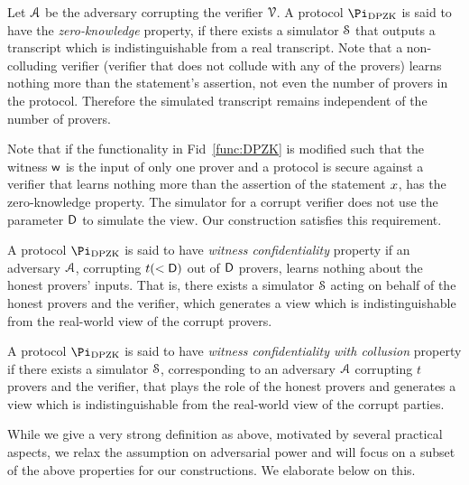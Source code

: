  Let $\mathcal{A}$ be the adversary corrupting the verifier $\mathcal{V}$. A protocol $\Pi_{\DPZK}$ is said to have the \textit{zero-knowledge} property, if there exists a simulator $\mathcal{S}$ that outputs a transcript which is indistinguishable from a real transcript. Note that a non-colluding verifier (verifier that does not collude with any of the provers) learns nothing more than the statement's assertion, not even the number of provers in the protocol. Therefore the simulated transcript remains independent of the number of provers.

Note that if the functionality in Fid~\ref{func:DPZK} is modified such that the witness $\mathsf{w}$ is the input of only one prover and a protocol is secure against a verifier that learns nothing more than the assertion of the statement ${x}$, has the zero-knowledge property. The simulator for a corrupt verifier does not use the parameter $\mathsf{D}$ to simulate the view. Our construction satisfies this requirement.

 A protocol $\Pi_{\DPZK}$ is said to have \textit{witness confidentiality} property if an adversary $\mathcal{A}$, corrupting $t( < \mathsf{D})$ out of $\mathsf{D}$ provers, learns nothing about the honest provers' inputs. That is, there exists a simulator $\mathcal{S}$ acting on behalf of the honest provers and the verifier, which generates a view which is indistinguishable from the real-world view of the corrupt provers.

  A protocol $\Pi_{\DPZK}$ is said to have \textit{witness confidentiality with collusion} property if there exists a simulator $\mathcal{S}$, corresponding to an adversary $\mathcal{A}$ corrupting $t$ provers and the verifier, that plays the role of the honest provers and generates a view which is indistinguishable from the real-world view of the corrupt parties.

While we give a very strong definition as above, motivated by several practical aspects, we relax the assumption on adversarial power and will focus on a subset of the above properties for our constructions. We elaborate below on this.

